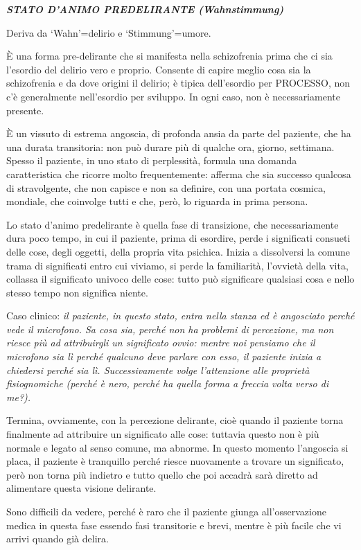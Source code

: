 \documentclass[]{article}
\begin{document}
\textbf{\emph{STATO D'ANIMO PREDELIRANTE (Wahnstimmung)}}

Deriva da `Wahn'=delirio e `Stimmung'=umore.

È una forma pre-delirante che si manifesta nella schizofrenia prima che
ci sia l'esordio del delirio vero e proprio. Consente di capire meglio
cosa sia la schizofrenia e da dove origini il delirio; è tipica
dell'esordio per PROCESSO, non c'è generalmente nell'esordio per
sviluppo. In ogni caso, non è necessariamente presente.

È un vissuto di estrema angoscia, di profonda ansia da parte del
paziente, che ha una durata transitoria: non può durare più di qualche
ora, giorno, settimana. Spesso il paziente, in uno stato di perplessità,
formula una domanda caratteristica che ricorre molto frequentemente:
afferma che sia successo qualcosa di stravolgente, che non capisce e non
sa definire, con una portata cosmica, mondiale, che coinvolge tutti e
che, però, lo riguarda in prima persona.

Lo stato d'animo predelirante è quella fase di transizione, che
necessariamente dura poco tempo, in cui il paziente, prima di esordire,
perde i significati consueti delle cose, degli oggetti, della propria
vita psichica. Inizia a dissolversi la comune trama di significati entro
cui viviamo, si perde la familiarità, l'ovvietà della vita, collassa il
significato univoco delle cose: tutto può significare qualsiasi cosa e
nello stesso tempo non significa niente.

Caso clinico: \emph{il paziente, in questo stato, entra nella stanza ed
è angosciato perché vede il microfono. Sa cosa sia, perché non ha
problemi di percezione, ma non riesce più ad attribuirgli un significato
ovvio: mentre noi pensiamo che il microfono sia lì perché qualcuno deve
parlare con esso, il paziente inizia a chiedersi perché sia lì.
Successivamente volge l'attenzione alle proprietà fisiognomiche (perché
è nero, perché ha quella forma a freccia volta verso di me?). }

Termina, ovviamente, con la percezione delirante, cioè quando il
paziente torna finalmente ad attribuire un significato alle cose:
tuttavia questo non è più normale e legato al senso comune, ma abnorme.
In questo momento l'angoscia si placa, il paziente è tranquillo perché
riesce nuovamente a trovare un significato, però non torna più indietro
e tutto quello che poi accadrà sarà diretto ad alimentare questa visione
delirante.

Sono difficili da vedere, perché è raro che il paziente giunga
all'osservazione medica in questa fase essendo fasi transitorie e brevi,
mentre è più facile che vi arrivi quando già delira.
\end{document}
